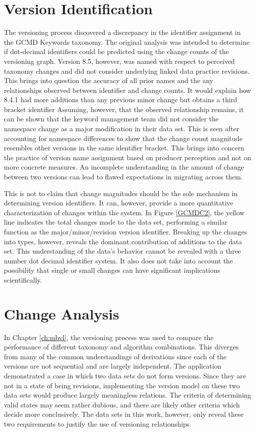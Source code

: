 \section{Version Identification}

The versioning process discovered a discrepancy in the identifier assignment in the GCMD Keywords taxonomy.
The original analysis was intended to determine if dot-decimal identifiers could be predicted using the change counts of the versioning graph.
Version 8.5, however, was named with respect to perceived taxonomy changes and did not consider underlying linked data practice revisions.
This brings into question the accuracy of all prior names and the any relationships observed between identifier and change counts.
It would explain how 8.4.1 had more additions than any previous minor change but obtains a third bracket identifier
Assuming, however, that the observed relationship remains, it can be shown that the keyword management team did not consider the namespace change as a major modification in their data set.
This is seen after accounting for namespace differences to show that the change count magnitude resembles other versions in the same identifier bracket.
This brings into concern the practice of version name assignment based on producer perception and not on more concrete measures.
An incomplete understanding in the amount of change between two versions can lead to flawed expectations in migrating across them.

This is not to claim that change magnitudes should be the sole mechanism in determining version identifiers.
It can, however, provide a more quantitative characterization of changes within the system.
In Figure \ref{GCMDC2}, the yellow line indicates the total changes made to the data set, performing a similar function as the major/minor/revision version identifier.
Breaking up the changes into types, however, reveals the dominant contribution of additions to the data set.
This understanding of the data's behavior cannot be revealed with a three number dot decimal identifier system.
It also does not take into account the possibility that single or small changes can have significant implications scientifically.

\section{Change Analysis}

In Chapter \ref{ch:mbvl}, the versioning process was used to compare the performance of different taxonomy and algorithm combinations.
This diverges from many of the common understandings of derivations since each of the versions are not sequential and are largely independent.
The application demonstrated a case in which two data sets do not form versions.
Since they are not in a state of being revisions, implementing the version model on these two data sets would produce largely meaningless relations.
The criteria of determining valid states may seem rather dubious, and there are likely other criteria which decide more conclusively.
The data sets in this work, however, only reveal these two requirements to justify the use of versioning relationships. 

